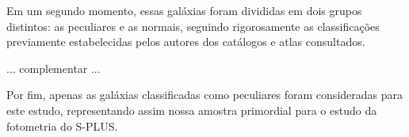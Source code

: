 Em um segundo momento, essas galáxias foram divididas em dois grupos distintos: as peculiares e as normais, seguindo rigorosamente as classificações previamente estabelecidas pelos autores dos catálogos e atlas consultados.

... complementar ...

Por fim, apenas as galáxias classificadas como peculiares foram consideradas para este estudo, representando assim nossa amostra primordial para o estudo da fotometria do S-PLUS.